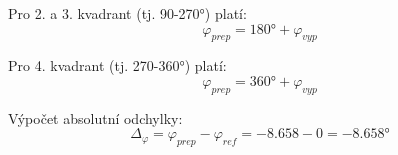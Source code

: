 \documentclass{protokol}
\begin{document}
    \noindent Pro 2. a 3. kvadrant (tj. 90-270°) platí:
    \begin{equation} \label{rov:pythagor}
        \varphi_{prep} = 180\text{°} + \varphi_{vyp}
    \end{equation}

    \noindent Pro 4. kvadrant (tj. 270-360°) platí:
    \begin{equation} \label{rov:pythagor}
        \varphi_{prep} = 360\text{°} + \varphi_{vyp}
    \end{equation}

    \noindent Výpočet absolutní odchylky:
    \begin{equation} \label{rov:pythagor}
        \Delta_{\varphi} = \varphi_{prep} - \varphi_{ref} = -8.658 - 0 = -8.658 \text{°}
    \end{equation}
\end{document}
